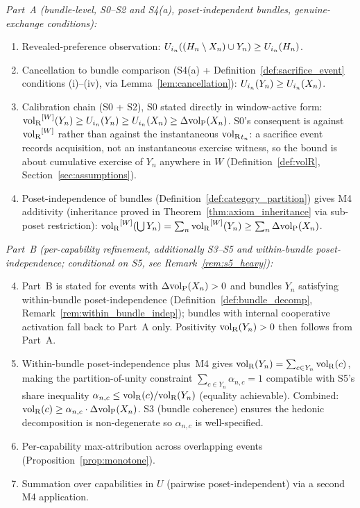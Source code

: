 \emph{Part~A (bundle-level, S0--S2 and S4(a),
poset-independent bundles, genuine-exchange conditions):}
\begin{enumerate}
\item Revealed-preference observation: $U_{i_{n}}((H_n \setminus
  X_n) \cup Y_n) \geq U_{i_{n}}(H_n)$.
\item Cancellation to bundle comparison (S4(a) +
  Definition~\ref{def:sacrifice_event} conditions (i)--(iv),
  via Lemma~\ref{lem:cancellation}):
  $U_{i_{n}}(Y_n) \geq U_{i_{n}}(X_n)$.
\item Calibration chain (S0 + S2), S0 stated directly in
  window-active form:
  ${\operatorname{vol}_{\mathrm{R}}}^{[W]}(Y_n) \geq U_{i_{n}}(Y_n) \geq U_{i_{n}}(X_n)
  \geq \Delta{\operatorname{vol}_{\mathrm{P}}}(X_n)$.  S0's consequent is against
  ${\operatorname{vol}_{\mathrm{R}}}^{[W]}$ rather than against the instantaneous
  ${\operatorname{vol}_{\mathrm{R}}}_{t_n}$: a sacrifice event records acquisition, not an
  instantaneous exercise witness, so the bound is about
  cumulative exercise of $Y_n$ anywhere in $W$
  (Definition~\ref{def:volR},
  Section~\ref{sec:assumptions}).
\item Poset-independence of bundles
  (Definition~\ref{def:category_partition}) gives M4 additivity
  (inheritance proved in Theorem~\ref{thm:axiom_inheritance}
  via sub-poset restriction):
  ${\operatorname{vol}_{\mathrm{R}}}^{[W]}(\bigcup Y_n) = \sum_n {\operatorname{vol}_{\mathrm{R}}}^{[W]}(Y_n) \geq
  \sum_n \Delta{\operatorname{vol}_{\mathrm{P}}}(X_n)$.
\end{enumerate}

\emph{Part~B (per-capability refinement, additionally S3--S5
and within-bundle poset-independence; conditional on S5, see
Remark~\ref{rem:s5_heavy}):}
\begin{enumerate}
\setcounter{enumi}{3}
\item Part~B is stated for events with $\Delta{\operatorname{vol}_{\mathrm{P}}}(X_n) > 0$
  and bundles $Y_n$ satisfying within-bundle poset-independence
  (Definition~\ref{def:bundle_decomp},
  Remark~\ref{rem:within_bundle_indep}); bundles with internal
  cooperative activation fall back to Part~A only.  Positivity
  ${\operatorname{vol}_{\mathrm{R}}}(Y_n) > 0$ then follows from Part~A.
\item Within-bundle poset-independence plus~M4 gives
  ${\operatorname{vol}_{\mathrm{R}}}(Y_n) = \sum_{c \in Y_n} {\operatorname{vol}_{\mathrm{R}}}(c)$, making the
  partition-of-unity constraint
  $\sum_{c \in Y_n} \alpha_{n,c} = 1$ compatible with S5's
  share inequality $\alpha_{n,c} \leq {\operatorname{vol}_{\mathrm{R}}}(c)/{\operatorname{vol}_{\mathrm{R}}}(Y_n)$
  (equality achievable).  Combined: ${\operatorname{vol}_{\mathrm{R}}}(c) \geq \alpha_{n,c}
  \cdot \Delta{\operatorname{vol}_{\mathrm{P}}}(X_n)$.  S3 (bundle coherence) ensures the
  hedonic decomposition is non-degenerate so $\alpha_{n,c}$ is
  well-specified.
\item Per-capability max-attribution across overlapping events
  (Proposition~\ref{prop:monotone}).
\item Summation over capabilities in $U$ (pairwise
  poset-independent) via a second M4 application.
\end{enumerate}

